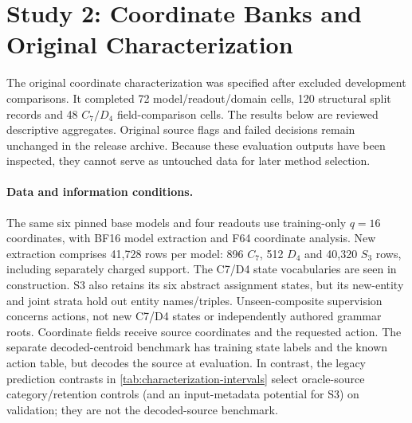 \section{Study 2: Coordinate Banks and Original Characterization}
\label{app:characterization}
The original coordinate characterization was specified after excluded development comparisons. It completed 72 model/readout/domain cells, 120 structural split records and 48 $C_7/D_4$ field-comparison cells. The results below are reviewed descriptive aggregates. Original source flags and failed decisions remain unchanged in the release archive. Because these evaluation outputs have been inspected, they cannot serve as untouched data for later method selection.

\paragraph{Data and information conditions.}
The same six pinned base models and four readouts use training-only $q=16$ coordinates, with BF16 model extraction and F64 coordinate analysis. New extraction comprises 41,728 rows per model: 896 $C_7$, 512 $D_4$ and 40,320 $S_3$ rows, including separately charged support. The C7/D4 state vocabularies are seen in construction. S3 also retains its six abstract assignment states, but its new-entity and joint strata hold out entity names/triples. Unseen-composite supervision concerns actions, not new C7/D4 states or independently authored grammar roots. Coordinate fields receive source coordinates and the requested action. The separate decoded-centroid benchmark has training state labels and the known action table, but decodes the source at evaluation. In contrast, the legacy prediction contrasts in \cref{tab:characterization-intervals} select oracle-source category/retention controls (and an input-metadata potential for S3) on validation; they are not the decoded-source benchmark.

